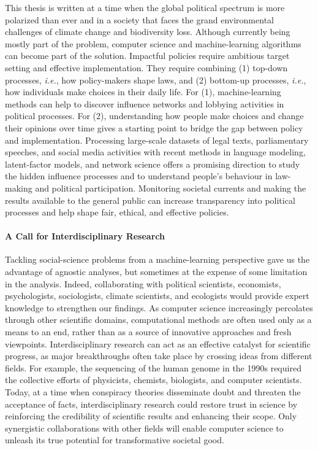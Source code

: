 This thesis is written at a time when the global political spectrum is more polarized than ever and in a society that faces the grand environmental challenges of climate change and biodiversity loss.
Although currently being mostly part of the problem, computer science and machine-learning algorithms can become part of the solution.
Impactful policies require ambitious target setting and effective implementation.
They require combining (1) top-down processes, \textit{i.e.}, how policy-makers shape laws, and (2) bottom-up processes, \textit{i.e.}, how individuals make choices in their daily life.
For (1), machine-learning methods can help to discover influence networks and lobbying activities in political processes.
For (2), understanding how people make choices and change their opinions over time gives a starting point to bridge the gap between policy and implementation.
Processing large-scale datasets of legal texts, parliamentary speeches, and social media activities with recent methods in language modeling, latent-factor models, and network science offers a promising direction to study the hidden influence processes and to understand people's behaviour in law-making and political participation.
Monitoring societal currents and making the results available to the general public can increase transparency into political processes and help shape fair, ethical, and effective policies.

\paragraph{A Call for Interdisciplinary Research}

Tackling social-science problems from a machine-learning perspective gave us the advantage of agnostic analyses, but sometimes at the expense of some limitation in the analysis.
Indeed, collaborating with political scientists, economists, psychologists, sociologists, climate scientists, and ecologists would provide expert knowledge to strengthen our findings.
As computer science increasingly percolates through other scientific domains, computational methods are often used only as a means to an end, rather than as a source of innovative approaches and fresh viewpoints.
Interdisciplinary research can act as an effective catalyst for scientific progress, as major breakthroughs often take place by crossing ideas from different fields.
For example, the sequencing of the human genome in the 1990s required the collective efforts of physicists, chemists, biologists, and computer scientists.
Today, at a time when conspiracy theories disseminate doubt and threaten the acceptance of facts, interdisciplinary research could restore trust in science by reinforcing the credibility of scientific results and enhancing their scope.
Only synergistic collaborations with other fields will enable computer science to unleash its true potential for transformative societal good.
